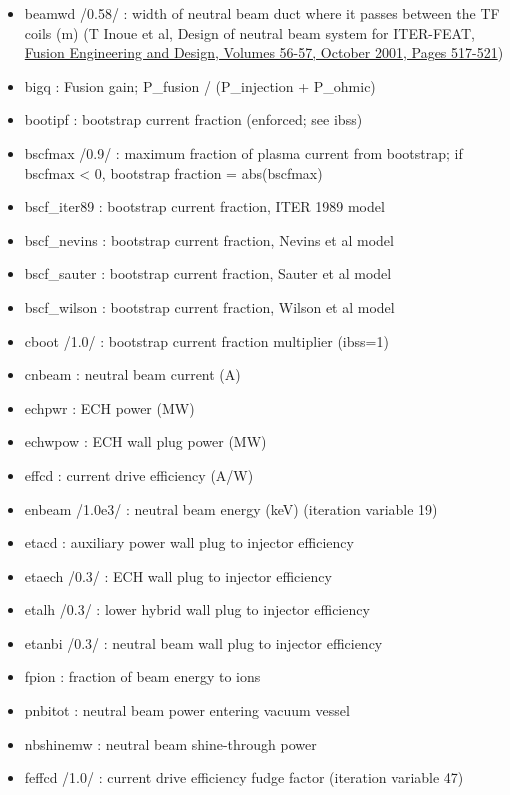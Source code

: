 \documentclass[
]{article}
\providecommand{\tightlist}{%
  \setlength{\itemsep}{0pt}\setlength{\parskip}{0pt}}
\begin{document}
\begin{itemize}
\tightlist
\item
  beamwd /0.58/ : width of neutral beam duct where it passes between the
  TF coils (m) (T Inoue et al, Design of neutral beam system for
  ITER-FEAT,
  \href{http://dx.doi.org/10.1016/S0920-3796(01)00339-8}{Fusion
  Engineering and Design, Volumes 56-57, October 2001, Pages 517-521})
\item
  bigq : Fusion gain; P\_fusion / (P\_injection + P\_ohmic)
\item
  bootipf : bootstrap current fraction (enforced; see ibss)
\item
  bscfmax /0.9/ : maximum fraction of plasma current from bootstrap; if
  bscfmax \textless{} 0, bootstrap fraction = abs(bscfmax)
\item
  bscf\_iter89 : bootstrap current fraction, ITER 1989 model
\item
  bscf\_nevins : bootstrap current fraction, Nevins et al model
\item
  bscf\_sauter : bootstrap current fraction, Sauter et al model
\item
  bscf\_wilson : bootstrap current fraction, Wilson et al model
\item
  cboot /1.0/ : bootstrap current fraction multiplier (ibss=1)
\item
  cnbeam : neutral beam current (A)
\item
  echpwr : ECH power (MW)
\item
  echwpow : ECH wall plug power (MW)
\item
  effcd : current drive efficiency (A/W)
\item
  enbeam /1.0e3/ : neutral beam energy (keV) (iteration variable 19)
\item
  etacd : auxiliary power wall plug to injector efficiency
\item
  etaech /0.3/ : ECH wall plug to injector efficiency
\item
  etalh /0.3/ : lower hybrid wall plug to injector efficiency
\item
  etanbi /0.3/ : neutral beam wall plug to injector efficiency
\item
  fpion : fraction of beam energy to ions
\item
  pnbitot : neutral beam power entering vacuum vessel
\item
  nbshinemw : neutral beam shine-through power
\item
  feffcd /1.0/ : current drive efficiency fudge factor (iteration
  variable 47)

\end{itemize}
\end{document}
